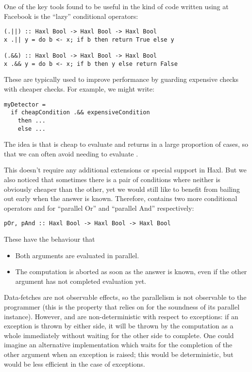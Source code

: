 One of the key tools found to be useful in the kind of code written
using \Haxl at Facebook is the ``lazy'' conditional operators:

\begin{verbatim}
(.||) :: Haxl Bool -> Haxl Bool -> Haxl Bool
x .|| y = do b <- x; if b then return True else y

(.&&) :: Haxl Bool -> Haxl Bool -> Haxl Bool
x .&& y = do b <- x; if b then y else return False
\end{verbatim}

These are typically used to improve performance by guarding expensive
checks with cheaper checks.  For example, we might write:

\begin{verbatim}
myDetector =
  if cheapCondition .&& expensiveCondition
    then ...
    else ...
\end{verbatim}

\noindent The idea is that  is cheap to evaluate and
returns  in a large proportion of cases, so that we can
often avoid needing to evaluate .

This doesn't require any additional extensions or special support in
Haxl. But we also noticed that sometimes there is a pair of conditions
where neither is obviously cheaper than the other, yet we would still
like to benefit from bailing out early when the answer is known.
Therefore, \Haxl contains two more conditional operators  and
 for ``parallel Or'' and ``parallel And'' respectively:

\begin{verbatim}
pOr, pAnd :: Haxl Bool -> Haxl Bool -> Haxl Bool
\end{verbatim}

These have the behaviour that

\begin{itemize}
\item Both arguments are evaluated in parallel.
\item The computation is aborted as soon as the answer is known, even
  if the other argument has not completed evaluation yet.
\end{itemize}

Data-fetches are not observable effects, so the parallelism is not
observable to the programmer (this is the property that \Haxl relies
on for the soundness of its parallel 
instance). However,  and  are non-deterministic with
respect to exceptions: if an exception is thrown by either side, it
will be thrown by the computation as a whole immediately without
waiting for the other side to complete.  One could imagine an
alternative implementation which waits for the completion of the other
argument when an exception is raised; this would be deterministic, but
would be less efficient in the case of exceptions.

